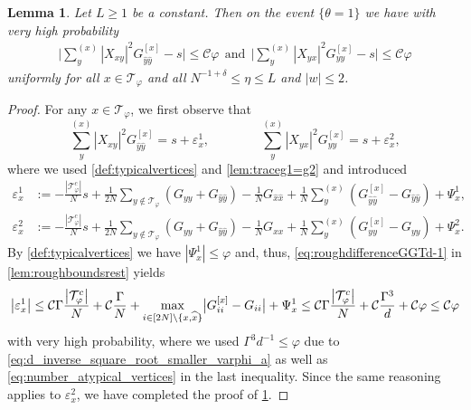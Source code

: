 \documentclass[11pt]{article}
\newcommand{\abs}[1]{\left| #1 \right|}
\newcommand{\absb}[1]{\bigl| #1 \bigr|}
\newcommand{\eps}{\varepsilon}
\theoremstyle{plain}
\newtheorem{lemma}{Lemma}[section]
\theoremstyle{remark}
\numberwithin{equation}{section}
\newcommand*\bset[1]{[#1]}
\newcommand*\ubarr[1]{{\widehat{#1}}}
\newcommand{\nc}{\normalcolor}
\begin{document}
	\nc
	 
	
	\begin{lemma}\label{lem:restmoy-s}
		Let $L \ge 1$ be a constant. Then on the event $\{ \theta =1\}$ we have with very high probability 
		\begin{align*}
			\bigg|	\sum_{y}^{(x)} \abs{X_{xy}}^2 G_{\ubarr{y}\ubarr{y}}^{\bset{x}} -s \bigg|\le \mathcal C \varphi  ~~ \text{and}~~\bigg| \sum_{y}^{(x)} \abs{X_{yx}}^2 G_{yy}^{\bset{x}} -s \bigg| \le  \mathcal{C}\varphi 
		\end{align*}
		uniformly for all $x \in \mathcal T_{\varphi}$ and all $N^{-1+ \delta} \le \eta \le L$ and $ \abs{w} \le 2$. 

	\end{lemma}
	
 
	
	\begin{proof}
		For any $x \in \mathcal{T}_\varphi$, we first observe that 
		\begin{equation*}
			\sum_{y}^{(x)} \abs{X_{xy}}^2 G_{\ubarr{y}\ubarr{y}}^{\bset{x}} =s + \eps^1_x, \qquad \qquad \sum_{y}^{(x)} \abs{X_{yx}}^2 G_{yy}^{\bset{x}} =s + \eps^2_x,
		\end{equation*}
		where we used \cref{def:typicalvertices} and \cref{lem:traceg1=g2} and  introduced 
		\begin{align}
			\eps^1_x &:=-\frac{\abs{\mathcal{T}_{\varphi}^c}}{N} s + \frac{1}{2N} \sum_{y \notin \mathcal{T}_{\varphi}}\left( G_{yy} + G_{\ubarr{y}\ubarr{y}} \right) - \frac{1}{N} G_{\ubarr{x} \ubarr{x}} +\frac{1}{N} \sum_{y}^{(x)} \left(G_{\ubarr{y}\ubarr{y}}^{\bset{x}} - G_{\ubarr{y}\ubarr{y}}\right) + \Psi_{x}^1, \label{eq:defi_epsilon_1}\\
			\eps^2_x &:=-\frac{\abs{\mathcal{T}_{\varphi}^c}}{N} s + \frac{1}{2N} \sum_{y \notin \mathcal{T}_{\varphi}}\left( G_{yy} + G_{\ubarr{y}\ubarr{y}} \right) - \frac{1}{N} G_{xx} + \frac{1}{N} \sum_{y}^{(x)}  \left(G_{yy}^{\bset{x}} - G_{yy}\right) + \Psi_{x}^2.\label{eq:defi_epsilon_2}
		\end{align}
		By \cref{def:typicalvertices} we have $\abs{\Psi_x^1}\leq \varphi$ and, thus,  \eqref{eq:roughdifferenceGGTd-1} in \cref{lem:roughboundsrest} yields 
		\[ 
		\absb{\eps_{x}^1} \le \mathcal{C}  \Gamma \nc \frac{\abs{\mathcal{T}_{\varphi}^c}}{N}+ \mathcal{C}\frac{ \Gamma \nc }{N}   +  \max_{i \in [2N] \backslash\{x,\ubarr{x}\}}\absb{G_{ii}^{\bset{x}} - G_{ii}} + \Psi_{x}^1
		\le \mathcal{C} \Gamma \nc  \frac{\abs{\mathcal{T}_{\varphi}^c}}{N} +  \mathcal C \frac{\Gamma^3}{d} \nc + \mathcal{C} \varphi \leq \mathcal C \varphi
		\] 
		with very high probability, 
		where we used $\Gamma^3 d^{-1} \le \varphi$ due to \cref{eq:d_inverse_square_root_smaller_varphi_a} as well as \cref{eq:number_atypical_vertices} 
		in the last inequality.  
		Since the same reasoning applies to $\eps_{x}^2$, we have completed the proof of \cref{lem:restmoy-s}.  
	\end{proof}
	
\end{document}
